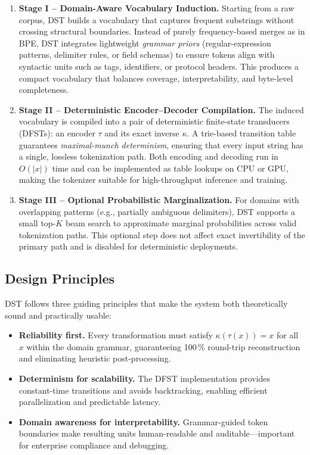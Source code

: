 \begin{enumerate}
  \item \textbf{Stage I – Domain-Aware Vocabulary Induction.}
  Starting from a raw corpus, DST builds a vocabulary that captures frequent substrings without crossing structural boundaries.
  Instead of purely frequency-based merges as in BPE, DST integrates lightweight \emph{grammar priors} (regular-expression patterns, delimiter rules, or field schemas) to ensure tokens align with syntactic units such as tags, identifiers, or protocol headers.
  This produces a compact vocabulary that balances coverage, interpretability, and byte-level completeness.

  \item \textbf{Stage II – Deterministic Encoder–Decoder Compilation.}
  The induced vocabulary is compiled into a pair of deterministic finite-state transducers (DFSTs): an encoder $\tau$ and its exact inverse $\kappa$.
  A trie-based transition table guarantees \emph{maximal-munch determinism}, ensuring that every input string has a single, lossless tokenization path.
  Both encoding and decoding run in $O(|x|)$ time and can be implemented as table lookups on CPU or GPU, making the tokenizer suitable for high-throughput inference and training.

  \item \textbf{Stage III – Optional Probabilistic Marginalization.}
  For domains with overlapping patterns (e.g., partially ambiguous delimiters), DST supports a small top-$K$ beam search to approximate marginal probabilities across valid tokenization paths.
  This optional step does not affect exact invertibility of the primary path and is disabled for deterministic deployments.
\end{enumerate}

\subsection{Design Principles}

DST follows three guiding principles that make the system both theoretically sound and practically usable:

\begin{itemize}
  \item \textbf{Reliability first.}
  Every transformation must satisfy $\kappa(\tau(x))=x$ for all $x$ within the domain grammar, guaranteeing 100\,\% round-trip reconstruction and eliminating heuristic post-processing.
  \item \textbf{Determinism for scalability.}
  The DFST implementation provides constant-time transitions and avoids backtracking, enabling efficient parallelization and predictable latency.
  \item \textbf{Domain awareness for interpretability.}
  Grammar-guided token boundaries make resulting units human-readable and auditable—important for enterprise compliance and debugging.
\end{itemize}

